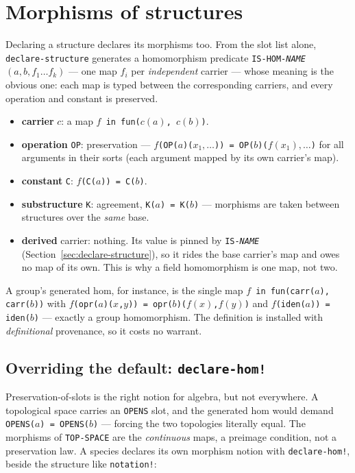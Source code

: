 \section{Morphisms of structures}
\label{sec:morphisms}

Declaring a structure declares its morphisms too.  From the slot list alone,
\texttt{declare-structure} generates a homomorphism predicate
\texttt{IS-HOM-\textit{NAME}}$(a, b, f_1 \ldots f_k)$ --- one map $f_i$ per
\emph{independent} carrier --- whose meaning is the obvious one: each map is
typed between the corresponding carriers, and every operation and constant is
preserved.

\begin{itemize}
\item \textbf{carrier} $c$: a map \texttt{$f$ in fun($c(a)$, $c(b)$)}.
\item \textbf{operation} \texttt{OP}: preservation ---
  \texttt{$f$(OP($a$)($x_1,\ldots$)) = OP($b$)($f(x_1),\ldots$)} for all
  arguments in their sorts (each argument mapped by its own carrier's map).
\item \textbf{constant} \texttt{C}: \texttt{$f$(C($a$)) = C($b$)}.
\item \textbf{substructure} \texttt{K}: agreement, \texttt{K($a$) = K($b$)} ---
  morphisms are taken between structures over the \emph{same} base.
\item \textbf{derived} carrier: nothing.  Its value is pinned by
  \texttt{IS-\textit{NAME}} (Section~\ref{sec:declare-structure}), so it rides
  the base carrier's map and owes no map of its own.  This is why a field
  homomorphism is one map, not two.
\end{itemize}

\noindent A group's generated hom, for instance, is the single map \texttt{$f$
in fun(carr($a$), carr($b$))} with \texttt{$f$(opr($a$)($x$,$y$)) =
opr($b$)($f(x)$,$f(y)$)} and \texttt{$f$(iden($a$)) = iden($b$)} --- exactly a
group homomorphism.  The definition is installed with \emph{definitional}
provenance, so it costs no warrant.

\subsection{Overriding the default: \texttt{declare-hom!}}
\label{sec:declare-hom}

Preservation-of-slots is the right notion for algebra, but not everywhere.  A
topological space carries an \texttt{OPENS} slot, and the generated hom would
demand \texttt{OPENS($a$) = OPENS($b$)} --- forcing the two topologies literally
equal.  The morphisms of \texttt{TOP-SPACE} are the \emph{continuous} maps, a
preimage condition, not a preservation law.  A species declares its own morphism
notion with \texttt{declare-hom!}, beside the structure like \texttt{notation!}:

